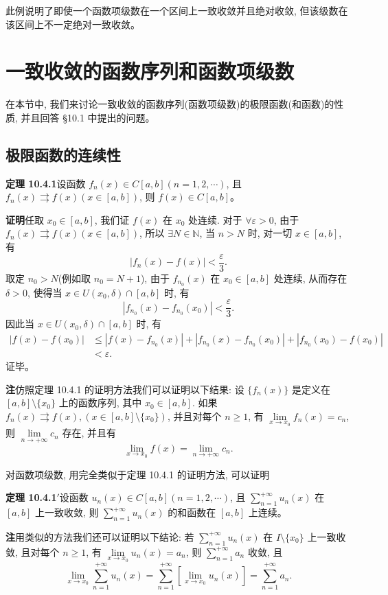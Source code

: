 \documentclass[UTF8,12pt,a4paper,fontset=fandol]{ctexart}
\begin{document}
此例说明了即使一个函数项级数在一个区间上一致收敛并且绝对收敛, 但该级数在该区间上不一定绝对一致收敛。

\section{一致收敛的函数序列和函数项级数}

在本节中, 我们来讨论一致收敛的函数序列(函数项级数)的极限函数(和函数)的性质, 并且回答 §10.1 中提出的问题。

\subsection{极限函数的连续性}

\noindent\textbf{定理 10.4.1}\quad 设函数 $f_n(x)\in C[a,b](n=1,2,\cdots)$, 且 $f_n(x)\rightrightarrows f(x)(x\in[a,b])$, 则 $f(x)\in C[a,b]$。

\noindent\textbf{证明}\quad 任取 $x_0\in[a,b]$, 我们证 $f(x)$ 在 $x_0$ 处连续. 对于 $\forall\varepsilon>0$, 由于 $f_n(x)\rightrightarrows f(x)(x\in[a,b])$, 所以 $\exists N\in\mathbb N$, 当 $n>N$ 时, 对一切 $x\in[a,b]$, 有
\[
  |f_n(x)-f(x)|<\frac\varepsilon3.
\]
取定 $n_0>N$(例如取 $n_0=N+1$), 由于 $f_{n_0}(x)$ 在 $x_0\in[a,b]$ 处连续, 从而存在 $\delta>0$, 使得当 $x\in U(x_0,\delta)\cap[a,b]$ 时, 有
\[
  |f_{n_0}(x)-f_{n_0}(x_0)|<\frac\varepsilon3.
\]
因此当 $x\in U(x_0,\delta)\cap[a,b]$ 时, 有
\[
\begin{aligned}
  |f(x)-f(x_0)|
  &\leq |f(x)-f_{n_0}(x)|+|f_{n_0}(x)-f_{n_0}(x_0)|+|f_{n_0}(x_0)-f(x_0)|\\
  &<\varepsilon.
\end{aligned}
\]
证毕。

\noindent\textbf{注}\quad 仿照定理 10.4.1 的证明方法我们可以证明以下结果: 设 $\{f_n(x)\}$ 是定义在 $[a,b]\setminus\{x_0\}$ 上的函数序列, 其中 $x_0\in[a,b]$. 如果 $f_n(x)\rightrightarrows f(x), (x\in[a,b]\setminus\{x_0\})$, 并且对每个 $n\geq1$, 有 $\lim\limits_{x\to x_0}f_n(x)=c_n$, 则 $\lim\limits_{n\to+\infty}c_n$ 存在, 并且有
\[
  \lim_{x\to x_0}f(x)=\lim_{n\to+\infty}c_n.
\]

对函数项级数, 用完全类似于定理 10.4.1 的证明方法, 可以证明

\noindent\textbf{定理 10.4.1$'$}\quad 设函数 $u_n(x)\in C[a,b](n=1,2,\cdots)$, 且 $\sum\limits_{n=1}^{+\infty}u_n(x)$ 在 $[a,b]$ 上一致收敛, 则 $\sum\limits_{n=1}^{+\infty}u_n(x)$ 的和函数在 $[a,b]$ 上连续。

\noindent\textbf{注}\quad 用类似的方法我们还可以证明以下结论: 若 $\sum\limits_{n=1}^{+\infty}u_n(x)$ 在 $I\setminus\{x_0\}$ 上一致收敛, 且对每个 $n\geq1$, 有 $\lim\limits_{x\to x_0}u_n(x)=a_n$, 则 $\sum\limits_{n=1}^{+\infty}a_n$ 收敛, 且
\[
  \lim_{x\to x_0}\sum_{n=1}^{+\infty}u_n(x)
  =\sum_{n=1}^{+\infty}\left[\lim_{x\to x_0}u_n(x)\right]
  =\sum_{n=1}^{+\infty}a_n.
\]
\end{document}
